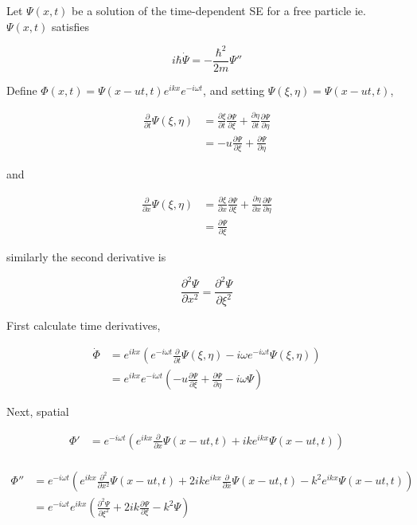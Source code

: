 \documentclass[a4paper]{article}
\begin{document}
Let $  \Psi(x,t) $ be a solution of the time-dependent SE for a free particle ie. $ \Psi(x,t) $ satisfies

\[ i \hbar \dot{\Psi} = - \frac{\hbar^{2}}{2m} \Psi'' \]

Define $ \Phi(x,t) = \Psi(x-ut,t)e^{ikx}e^{-i \omega t} $, and setting $ \Psi(\xi,\eta) = \Psi(x-ut,t) $,

\begin{align*}
\frac{\partial }{\partial t} \Psi(\xi,\eta) & = \frac{\partial \xi }{\partial t} \frac{\partial \Psi }{\partial \xi} + \frac{\partial \eta }{\partial  t}\frac{\partial \Psi}{\partial \eta}  \\
& = - u \frac{\partial \Psi }{\partial \xi} +\frac{\partial \Psi}{\partial \eta} 
\end{align*}

and 

\begin{align*}
\frac{\partial }{\partial x} \Psi(\xi,\eta) & = \frac{\partial \xi }{\partial x} \frac{\partial \Psi }{\partial \xi} + \frac{\partial \eta }{\partial  x}\frac{\partial \Psi}{\partial \eta}  \\
& = \frac{\partial \Psi }{\partial \xi} 
\end{align*}

similarly the second derivative is

\[ \frac{\partial^{2} \Psi }{\partial x^{2}} = \frac{\partial^{2} \Psi }{\partial \xi^{2}}  \]


First calculate time derivatives,

\begin{align*}
\dot{\Phi} &  = e^{ikx} \left(  e^{-i \omega t} \frac{\partial }{\partial t} \Psi(\xi,\eta) - i \omega e^{-i \omega t} \Psi(\xi,\eta)  \right)   \\
& = e^{ikx}e^{-i \omega t} \left(  - u \frac{\partial \Psi }{\partial \xi} +\frac{\partial \Psi}{\partial \eta}   - i \omega \Psi \right) 
\end{align*}

Next, spatial 

\begin{align*}
\Phi'& = e^{- i \omega t} \left(  e^{i k x } \frac{\partial }{\partial x} \Psi(x - ut,t) + i k e^{i k x} \Psi(x-ut,t)  \right)   \\ 
\end{align*}

\begin{align*}
\Phi'' & = e^{- i \omega t} \left(  e^{i k x } \frac{\partial^{2} }{\partial x^{2}} \Psi(x - ut,t) + 2 i k e^{i k x} \frac{\partial }{\partial x}\Psi(x-ut,t)  - k^{2} e^{i k x} \Psi(x-ut,t)  \right)   \\ 
& = e^{- i \omega t}  e^{i k x } \left( \frac{\partial^{2} \Psi }{\partial \xi^{2}} + 2 i k \frac{\partial \Psi }{\partial \xi}  - k^{2} \Psi  \right)   \\ 
\end{align*}
\end{document}
